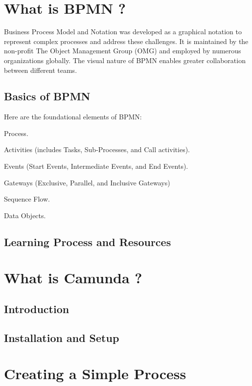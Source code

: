 \documentclass[12pt]{article}
\begin{document}
{\section{What is BPMN ?}

Business Process Model and Notation was developed as a graphical notation to represent complex processes and address these challenges. It is maintained by the non-profit The Object Management Group (OMG) and employed by numerous organizations globally. The visual nature of BPMN enables greater collaboration between different teams.

  \subsection{Basics of BPMN}

Here are the foundational elements of BPMN:

    \item Process.
    \item Activities (includes Tasks, Sub-Processes, and Call activities).
    \item Events (Start Events, Intermediate Events, and End Events).
    \item Gateways (Exclusive, Parallel, and Inclusive Gateways)
    \item Sequence Flow.
    \item Data Objects.

  \subsection{Learning Process and Resources}

\pagebreak

\section{What is Camunda ?}
  \subsection{Introduction}
  \subsection{Installation and Setup}

\pagebreak

\section{Creating a Simple Process}
}
\end{document}
